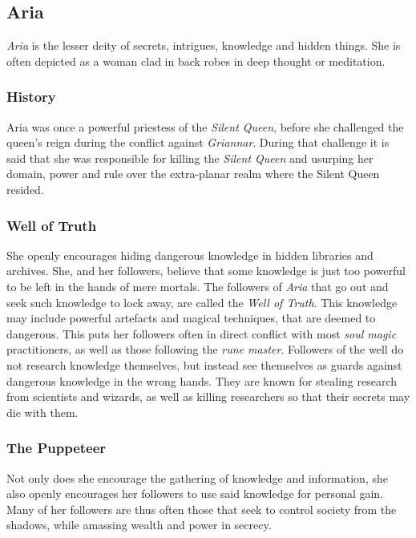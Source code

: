 \subsection{Aria}


\emph{Aria} is the lesser deity of secrets, intrigues, knowledge and hidden
things. She is often depicted as a woman clad in back robes in deep thought
or meditation.

\subsubsection*{History}

Aria was once a powerful priestess of the \emph{Silent Queen}, before she
challenged the queen's reign during the conflict against \emph{Griannar}.
During that challenge it is said that she was responsible for killing the
\emph{Silent Queen} and usurping her domain, power and rule over the
extra-planar realm where the Silent Queen resided.

\subsubsection*{Well of Truth}

She openly encourages hiding dangerous knowledge in hidden libraries and
archives. She, and her followers, believe that some knowledge is just too
powerful to be left in the hands of mere mortals. The followers of \emph{Aria}
that go out and seek such knowledge to lock away, are called the \emph{Well of
  Truth}. This knowledge may include powerful artefacts and magical
techniques, that are deemed to dangerous. This puts her followers often in
direct conflict with most \emph{soul magic} practitioners, as well as those
following the \emph{rune master}. Followers of the well do not research
knowledge themselves, but instead see themselves as guards against dangerous
knowledge in the wrong hands. They are known for stealing research from
scientists and wizards, as well as killing researchers so that their secrets
may die with them.

\subsubsection*{The Puppeteer}

Not only does she encourage the gathering of knowledge and information, she
also openly encourages her followers to use said knowledge for personal gain.
Many of her followers are thus often those that seek to control society from
the shadows, while amassing wealth and power in secrecy.

